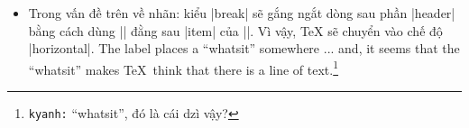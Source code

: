 \begin{itemize}
\medskip
Câu hỏi đặt ra là, làm thế nào để xác định thời điểm \LaTeX{} vừa kết thúc
việc biểu diễn công thức toán?
\item 
Trong vấn đề trên về nhãn: kiểu |break| sẽ gắng ngắt dòng sau phần |header|
bằng cách dùng |\hfill{}| đằng sau |item| của |\trivlist|.
Vì vậy, \TeX{} sẽ chuyển vào chế độ |horizontal|.
The label places a ``whatsit''
somewhere ... and, it seems that the ``whatsit'' makes \TeX\ think
that there is a line of text.\footnote{\texttt{kyanh:} ``whatsit'', đó là cái dzì vậy?}
\end{itemize}

\endinput
